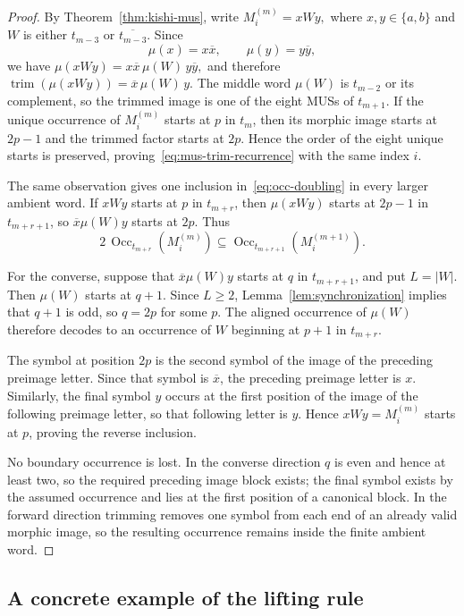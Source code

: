 \documentclass[11pt,a4paper]{article}
\theoremstyle{definition}\newtheorem{definition}[theorem]{Definition}
\theoremstyle{remark}\newtheorem{remark}[theorem]{Remark}
\newcommand{\Occ}{\operatorname{Occ}}
\begin{document}
\begin{proof}
By Theorem~\ref{thm:kishi-mus}, write
$
M_i^{(m)}=xWy,
$
where $x,y\in\{a,b\}$ and $W$ is either $t_{m-3}$ or $\overline{t_{m-3}}$. Since
\[
\mu(x)=x\overline{x},\qquad \mu(y)=y\overline{y},
\]
we have
$
\mu(xWy)=x\overline{x}\,\mu(W)\,y\overline{y},
$
and therefore
$
\operatorname{trim}(\mu(xWy))=\overline{x}\,\mu(W)\,y.
$
The middle word $\mu(W)$ is $t_{m-2}$ or its complement, so the trimmed image is one of the eight MUSs of $t_{m+1}$. If the unique occurrence of $M_i^{(m)}$ starts at $p$ in $t_m$, then its morphic image starts at $2p-1$ and the trimmed factor starts at $2p$. Hence the order of the eight unique starts is preserved, proving~\eqref{eq:mus-trim-recurrence} with the same index $i$.

The same observation gives one inclusion in~\eqref{eq:occ-doubling} in every larger ambient word. If $xWy$ starts at $p$ in $t_{m+r}$, then $\mu(xWy)$ starts at $2p-1$ in $t_{m+r+1}$, so $\overline{x}\mu(W)y$ starts at $2p$. Thus
\[
2\,\Occ_{t_{m+r}}(M_i^{(m)})
\subseteq
\Occ_{t_{m+r+1}}(M_i^{(m+1)}).
\]

For the converse, suppose that $\overline{x}\mu(W)y$ starts at $q$ in $t_{m+r+1}$, and put $L=|W|$. Then $\mu(W)$ starts at $q+1$. Since $L\ge2$, Lemma~\ref{lem:synchronization} implies that $q+1$ is odd, so $q=2p$ for some $p$. The aligned occurrence of $\mu(W)$ therefore decodes to an occurrence of $W$ beginning at $p+1$ in $t_{m+r}$.

The symbol at position $2p$ is the second symbol of the image of the preceding preimage letter. Since that symbol is $\overline{x}$, the preceding preimage letter is $x$. Similarly, the final symbol $y$ occurs at the first position of the image of the following preimage letter, so that following letter is $y$. Hence $xWy=M_i^{(m)}$ starts at $p$, proving the reverse inclusion.

No boundary occurrence is lost. In the converse direction $q$ is even and hence at least two, so the required preceding image block exists; the final symbol exists by the assumed occurrence and lies at the first position of a canonical block. In the forward direction trimming removes one symbol from each end of an already valid morphic image, so the resulting occurrence remains inside the finite ambient word.
\end{proof}

\subsection{A concrete example of the lifting rule}
\label{subsec:lifting-example}
\end{document}
